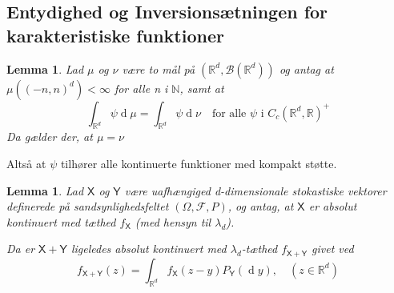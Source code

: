 \documentclass{article}
\newcommand{\N}{\mathbb{N}}
\newcommand{\R}{\mathbb{R}}
\newcommand{\1}{\mathbbm{1}}
\newcommand{\X}{\mathsf{X}}
\newcommand{\Y}{\mathsf{Y}}
\newcommand{\B}{\mathcal{B}}
\newcommand{\deriv}{\operatorname{d}}
\newcommand{\pfield}{(\Omega, \mathcal{F}, P)}
\theoremstyle{boxed}
\newtheorem{lemma}[theorem]{Lemma}
\begin{document}
\subsection{Entydighed og Inversionsætningen for karakteristiske funktioner}
\begin{theorem-box}
    \begin{lemma}
        Lad $\mu$ og $\nu$ være to mål på $(\R^d, \B(\R^d))$ og antag at $\mu((-n,n)^d)<\infty$ for alle n i $\N$, samt at
        $$\int_{\R^d}\psi \deriv \mu =\int_{\R^d}\psi \deriv \nu\quad \text{for alle }\psi \text{ i } C_c(\R^d,\R)^+$$
        Da gælder der, at $\mu=\nu$
    \end{lemma}
\end{theorem-box}
Altså at $\psi$ tilhører alle kontinuerte funktioner med kompakt støtte.
\begin{theorem-box}
    \begin{lemma}
        Lad $\X$ og $\Y$ være uafhængiged d-dimensionale stokastiske vektorer definerede på sandsynlighedsfeltet $\pfield$, og antag, at $\X$ er absolut kontinuert med tæthed $f_\X$ (med hensyn til $\lambda_d$).

        Da er $\X+\Y$ ligeledes absolut kontinuert med $\lambda_d$-tæthed $f_{\X+\Y}$ givet ved
        $$f_{\X+\Y}(z)=\int_{\R^d}f_\X(z-y)P_\Y(\deriv y), \quad (z\in\R^d)$$
    \end{lemma}
\end{theorem-box}
\end{document}
